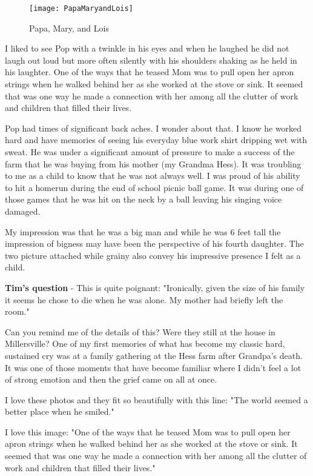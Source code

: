 \begin{figure}
\centering
\texttt{[image: PapaMaryandLois]}
\caption{Papa, Mary, and Lois}
\end{figure}
I liked to see Pop with a twinkle in his eyes and when he laughed he did not laugh out loud but more often silently with his shoulders shaking as he held in his laughter.
One of the ways that he teased Mom was to pull open her apron strings when he walked behind her as she worked at the stove or sink.
It seemed that was one way he made a connection with her among all the clutter of work and children that filled their lives.

Pop had times of significant back aches.
I wonder about that.
I know he worked hard and have memories of seeing his everyday blue work shirt dripping wet with sweat.
He was under a significant amount of pressure to make a success of the farm that he was buying from his mother (my Grandma Hess).
It was troubling to me as a child to know that he was not always well.
I was proud of his ability to hit a homerun during the end of school picnic ball game.
It was during one of those games that he was hit on the neck by a ball leaving his singing voice damaged.

My impression was that he was a big man and while he was 6 feet tall the impression of bigness may have been the perspective of his fourth daughter.
The two picture attached while grainy also convey his impressive presence I felt as a child.

\textbf{Tim's question} - This is quite poignant: "Ironically, given the size of his family it seems he chose to die when he was alone.
My mother had briefly left the room."

Can you remind me of the details of this? Were they still at the house in Millersville? One of my first memories of what has become my classic hard, sustained cry was at a family gathering at the Hess farm after Grandpa's death.
It was one of those moments that have become familiar where I didn't feel a lot of strong emotion and then the grief came on all at once.

I love these photos and they fit so beautifully with this line: "The world seemed a better place when he smiled."

I love this image: "One of the ways that he teased Mom was to pull open her apron strings when he walked behind her as she worked at the stove or sink.
It seemed that was one way he made a connection with her among all the clutter of work and children that filled their lives."

